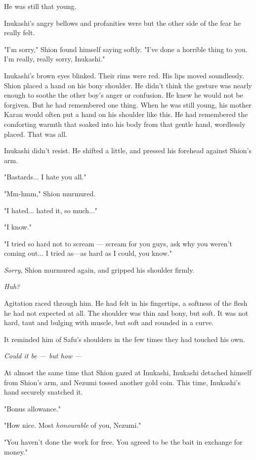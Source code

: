 He was still that young.

Inukashi's angry bellows and profanities were but the other side of the
fear he really felt.

"I'm sorry," Shion found himself saying softly. "I've done a horrible
thing to you. I'm really, really sorry, Inukashi."

Inukashi's brown eyes blinked. Their rims were red. His lips moved
soundlessly. Shion placed a hand on his bony shoulder. He didn't think
the gesture was nearly enough to soothe the other boy's anger or
confusion. He knew he would not be forgiven. But he had remembered one
thing. When he was still young, his mother Karan would often put a hand
on his shoulder like this. He had remembered the comforting warmth that
soaked into his body from that gentle hand, wordlessly placed. That was
all.

Inukashi didn't resist. He shifted a little, and pressed his forehead
against Shion's arm.

"Bastards... I hate you all."

"Mm-hmm," Shion murmured.

"I hated... hated it, so much..."

"I know."

"I tried so hard not to scream --- scream for you guys, ask why you
weren't coming out... I tried as---as hard as I could, you know."

\emph{Sorry}, Shion murmured again, and gripped his shoulder firmly.

\emph{Huh?}

Agitation raced through him. He had felt in his fingertips, a softness
of the flesh he had not expected at all. The shoulder was thin and bony,
but soft. It was not hard, taut and bulging with muscle, but soft and
rounded in a curve.

It reminded him of Safu's shoulders in the few times they had touched
his own.

\emph{Could it be --- but how ---}

At almost the same time that Shion gazed at Inukashi, Inukashi detached
himself from Shion's arm, and Nezumi tossed another gold coin. This
time, Inukashi's hand securely snatched it.

"Bonus allowance."

"How nice. Most \emph{honourable} of you, Nezumi."

"You haven't done the work for free. You agreed to be the bait in
exchange for money."

